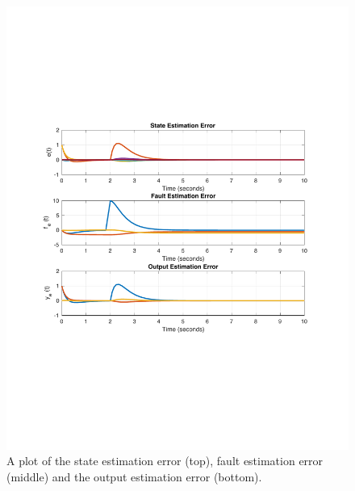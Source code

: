 \documentclass[letterpaper, 11 pt, conference]{ieeeconf}  %
\begin{document}
\begin{figure}
    \centering
    \includegraphics[scale=0.5]{images/estError.pdf}
    \caption{A plot of the state estimation error (top), fault estimation error (middle) and the output estimation error (bottom). }
    \label{fig:D_PIO_1}
\end{figure}
\end{document}
